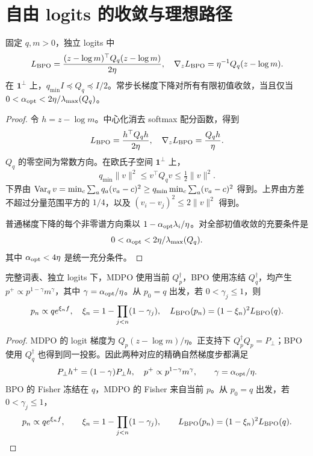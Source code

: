 \section{自由 logits 的收敛与理想路径}
\begin{theorem}
固定 $q,m>0$，独立 logits 中
\begin{equation}
L_{\rm BPO}=\frac{(z-\log m)^\top Q_q(z-\log m)}{2\eta},
\quad\nabla_zL_{\rm BPO}=\eta^{-1}Q_q(z-\log m).
\end{equation}
在 $\mathbf1^\perp$ 上，$q_{\min}I\preceq Q_q\preceq I/2$。常步长梯度下降对所有有限初值收敛，当且仅当 $0<\alpha_{\rm opt}<2\eta/\lambda_{\max}(Q_q)$。
\end{theorem}
\begin{proof}
令 $h=z-\log m$。中心化消去 softmax 配分函数，得到
\begin{equation}
L_{\rm BPO}=\frac{h^\top Q_qh}{2\eta},\quad
\nabla_zL_{\rm BPO}=\frac{Q_qh}{\eta}.
\end{equation}
$Q_q$ 的零空间为常数方向。在欧氏子空间 $\mathbf1^\perp$ 上，
\begin{equation}
q_{\min}\|v\|^2\le v^\top Q_qv\le\tfrac12\|v\|^2.
\end{equation}
下界由 $\operatorname{Var}_qv=\min_c\sum_aq_a(v_a-c)^2\ge q_{\min}\min_c\sum_a(v_a-c)^2$ 得到。上界由方差不超过分量范围平方的 $1/4$，以及 $(v_i-v_j)^2\le2\|v\|^2$ 得到。

普通梯度下降的每个非零谱方向乘以 $1-\alpha_{\rm opt}\lambda_i/\eta$。对全部初值收敛的充要条件是
\begin{equation}
0<\alpha_{\rm opt}<2\eta/\lambda_{\max}(Q_q).
\end{equation}
其中 $\alpha_{\rm opt}<4\eta$ 是统一充分条件。
\end{proof}

\begin{proposition}
完整词表、独立 logits 下，MDPO 使用当前 $Q_p^\dagger$，BPO 使用冻结 $Q_q^\dagger$，均产生 $p^+\propto p^{1-\gamma}m^\gamma$，其中 $\gamma=\alpha_{\rm opt}/\eta$。从 $p_0=q$ 出发，若 $0<\gamma_j\le1$，则
\begin{equation}
p_n\propto qe^{\xi_nf},\quad \xi_n=1-\prod_{j<n}(1-\gamma_j),\quad
L_{\rm BPO}(p_n)=(1-\xi_n)^2L_{\rm BPO}(q).
\end{equation}
\end{proposition}
\begin{proof}
MDPO 的 logit 梯度为 $Q_p(z-\log m)/\eta$。正支持下 $Q_p^\dagger Q_p=P_\perp$；BPO 使用 $Q_q^\dagger$ 也得到同一投影。因此两种对应的精确自然梯度步都满足
\begin{equation}
P_\perp h^+=(1-\gamma)P_\perp h,\quad
p^+\propto p^{1-\gamma}m^\gamma,\qquad
\gamma=\alpha_{\rm opt}/\eta.
\end{equation}
BPO 的 Fisher 冻结在 $q$，MDPO 的 Fisher 来自当前 $p$。从 $p_0=q$ 出发，若 $0<\gamma_j\le1$，
\begin{equation}
p_n\propto qe^{\xi_nf},\qquad
\xi_n=1-\prod_{j<n}(1-\gamma_j),\qquad
L_{\rm BPO}(p_n)=(1-\xi_n)^2L_{\rm BPO}(q).
\end{equation}
\end{proof}


